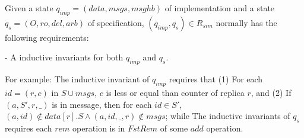 

Given a state $q_{\mathit{imp}} = (\mathit{data},\mathit{msgs},\mathit{msghb})$ of implementation and a state $q_s = (O,\mathit{ro},\mathit{del},\mathit{arb})$ of specification, $(q_{\mathit{imp}},q_s) \in R_{\mathit{sim}}$ normally has the following requirements:

\noindent - A inductive invariants for both $q_{\mathit{imp}}$ and $q_s$. %

For example: The inductive invariant of $q_{\mathit{imp}}$ requires that (1) For each $\mathit{id} = (r,c)$ in $S \cup \mathit{msgs}$, $c$ is less or equal than counter of replica $r$, and (2) If $(a,S',r,\_)$ is in message, then for each $\mathit{id} \in S'$, $(a,\mathit{id}) \notin \mathit{data}[r].S \wedge (a,\mathit{id},\_,r) \notin \mathit{msgs}$; while The inductive invariants of $q_s$ requires each $\mathit{rem}$ operation is in $\mathit{FstRem}$ of some $\mathit{add}$ operation.

